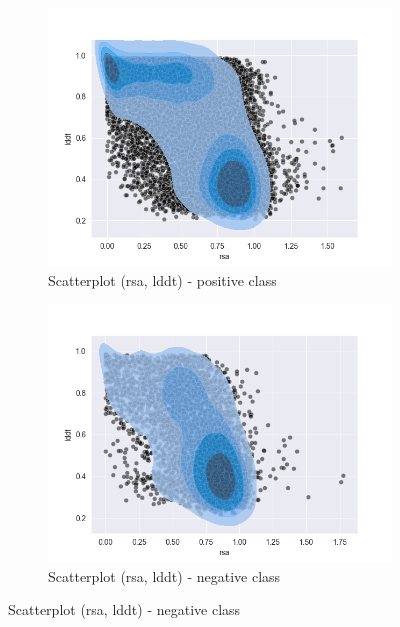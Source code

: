 \begin{figure}[h!]
    \centering
    \begin{subfigure}{0.8\linewidth}
        \includegraphics[width=\linewidth]{res/analysis/plots/bind0-scatter_rsa-lddt.png}
        \caption{Scatterplot (rsa, lddt) - positive class}
    \end{subfigure}
    \vfill
    \begin{subfigure}{0.8\linewidth}
        \includegraphics[width=\linewidth]{res/analysis/plots/bind1-scatter_rsa-lddt.png}
        \caption{Scatterplot (rsa, lddt) - negative class}
    \end{subfigure}
\end{figure}


